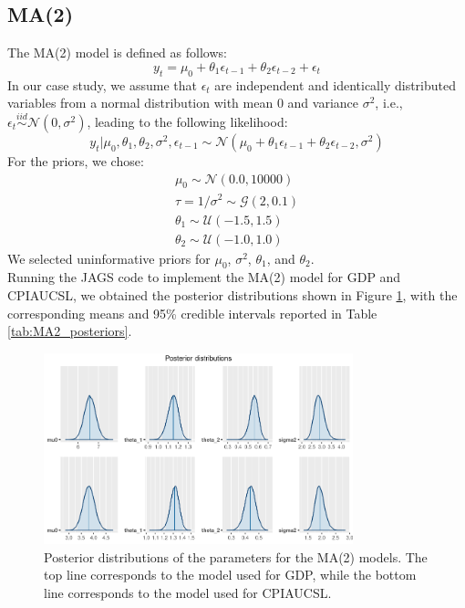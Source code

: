 \subsection*{MA(2)}
The MA(2) model is defined as follows:
\begin{equation}
    \label{eq:MA2}
    y_{t} = \mu_{0} + \theta_1 \epsilon_{t-1} + \theta_2 \epsilon_{t-2} + \epsilon_t
\end{equation}
In our case study, we assume that $\epsilon_t$ are independent and identically distributed variables from a normal distribution with mean $0$ and variance $\sigma^2$, i.e., $\epsilon_t \stackrel{iid}{\sim} \mathcal{N}(0,\sigma^2)$, leading to the following likelihood:
\begin{equation}
    \label{eq:MA2_likelihood}
    y_{t}|\mu_{0},\theta_1,\theta_2,\sigma^2,\epsilon_{t-1} \sim \mathcal{N}(\mu_{0} + \theta_1 \epsilon_{t-1} + \theta_2 \epsilon_{t-2}, \sigma^2)
\end{equation}
For the priors, we chose:
\begin{equation}
    \label{eq:MA2_priors}
    \begin{split}
        \mu_0 \sim \mathcal{N}(0.0, 10000) \\
        \tau = 1 / \sigma^2 \sim \mathcal{G}(2, 0.1) \\
        \theta_1 \sim \mathcal{U}(-1.5, 1.5) \\
        \theta_2 \sim \mathcal{U}(-1.0, 1.0)
    \end{split}
\end{equation}
We selected uninformative priors for $\mu_{0}$, $\sigma^2$, $\theta_1$, and $\theta_2$. \\
Running the JAGS code to implement the MA(2) model for GDP and CPIAUCSL, we obtained the posterior distributions shown in Figure \ref{fig:MA2_posteriors}, with the corresponding means and 95\% credible intervals reported in Table \ref{tab:MA2_posteriors}. \\
\begin{figure}[H]
    \centering
    \includegraphics[width=0.8\textwidth]{images/3-MA/posteriors2.png}
    \caption{Posterior distributions of the parameters for the MA(2) models. The top line corresponds to the model used for GDP, while the bottom line corresponds to the model used for CPIAUCSL.}
    \label{fig:MA2_posteriors}
\end{figure} 
